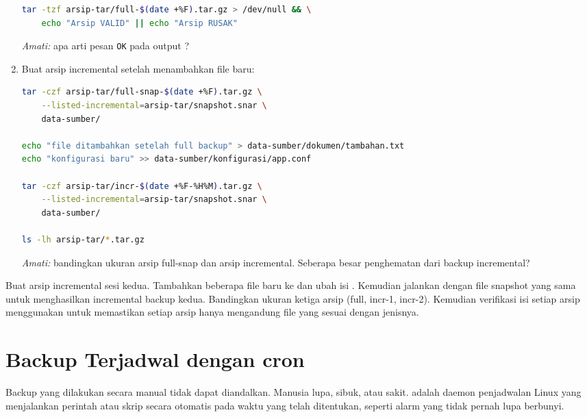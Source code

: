 \begin{enumerate}
\begin{lstlisting}[language=bash, caption={Verifikasi integritas dengan checksum}]
tar -tzf arsip-tar/full-$(date +%F).tar.gz > /dev/null && \
    echo "Arsip VALID" || echo "Arsip RUSAK"
\end{lstlisting}
    \textit{Amati:} apa arti pesan \texttt{OK} pada output ?

    \item Buat arsip incremental setelah menambahkan file baru:
\begin{lstlisting}[language=bash, caption={Backup incremental dengan snapshot}]
tar -czf arsip-tar/full-snap-$(date +%F).tar.gz \
    --listed-incremental=arsip-tar/snapshot.snar \
    data-sumber/

echo "file ditambahkan setelah full backup" > data-sumber/dokumen/tambahan.txt
echo "konfigurasi baru" >> data-sumber/konfigurasi/app.conf

tar -czf arsip-tar/incr-$(date +%F-%H%M).tar.gz \
    --listed-incremental=arsip-tar/snapshot.snar \
    data-sumber/

ls -lh arsip-tar/*.tar.gz
\end{lstlisting}
    \textit{Amati:} bandingkan ukuran arsip full-snap dan arsip incremental.
    Seberapa besar penghematan dari backup incremental?
\end{enumerate}

\begin{challengebox}
Buat arsip incremental sesi kedua. Tambahkan beberapa file baru ke
 dan ubah isi . Kemudian jalankan
\cmd{tar} dengan file snapshot yang sama untuk menghasilkan incremental backup
kedua. Bandingkan ukuran ketiga arsip (full, incr-1, incr-2). Kemudian verifikasi
isi setiap arsip menggunakan \cmd{tar -tzf} untuk memastikan setiap arsip
hanya mengandung file yang sesuai dengan jenisnya.
\end{challengebox}

\section{Backup Terjadwal dengan cron}
\label{sec:scheduled-backup}

Backup yang dilakukan secara manual tidak dapat diandalkan. Manusia lupa,
sibuk, atau sakit.  adalah daemon penjadwalan Linux yang menjalankan
perintah atau skrip secara otomatis pada waktu yang telah ditentukan, seperti
alarm yang tidak pernah lupa berbunyi.

